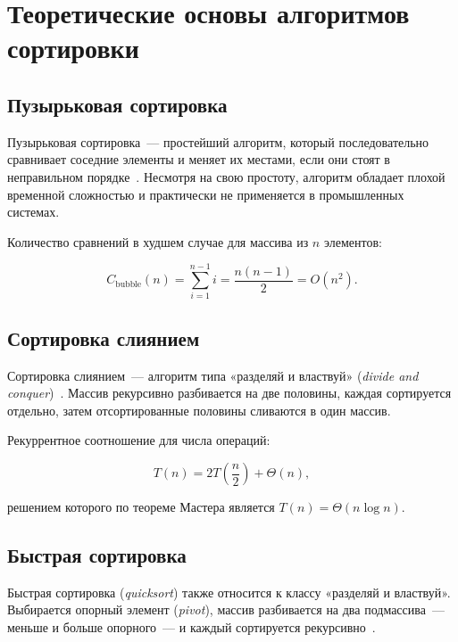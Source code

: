 \section{Теоретические основы алгоритмов сортировки}

\subsection{Пузырьковая сортировка}

Пузырьковая сортировка~--- простейший алгоритм, который последовательно
сравнивает соседние элементы и меняет их местами, если они стоят в
неправильном порядке~\cite{Knuth}. Несмотря на свою простоту, алгоритм
обладает плохой временной сложностью и практически не применяется в
промышленных системах.

Количество сравнений в худшем случае для массива из \(n\) элементов:

\begin{equation}
    \label{eq:bubble}
    C_{\text{bubble}}(n) = \sum_{i=1}^{n-1} i = \frac{n(n-1)}{2} = O(n^2).
\end{equation}

\subsection{Сортировка слиянием}

Сортировка слиянием~--- алгоритм типа «разделяй и властвуй»
(\textit{divide and conquer})~\cite{Cormen}. Массив рекурсивно
разбивается на две половины, каждая сортируется отдельно, затем
отсортированные половины сливаются в один массив.

Рекуррентное соотношение для числа операций:

\begin{equation}
    \label{eq:mergesort}
    T(n) = 2T\!\left(\frac{n}{2}\right) + \Theta(n),
\end{equation}

решением которого по теореме Мастера является \(T(n) = \Theta(n \log n)\).

\subsection{Быстрая сортировка}

Быстрая сортировка (\textit{quicksort}) также относится к классу
«разделяй и властвуй». Выбирается опорный элемент (\textit{pivot}),
массив разбивается на два подмассива~--- меньше и больше опорного~---
и каждый сортируется рекурсивно~\cite{Hoare}.

